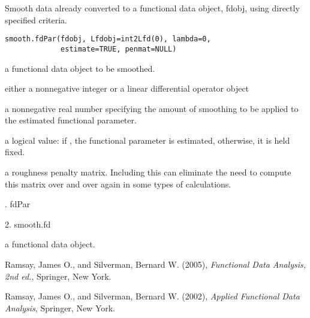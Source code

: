 \begin{Description}\relax
Smooth data already converted to a functional data object, fdobj,
using directly specified criteria.
\end{Description}
\begin{Usage}
\begin{verbatim}
smooth.fdPar(fdobj, Lfdobj=int2Lfd(0), lambda=0,
             estimate=TRUE, penmat=NULL) 
\end{verbatim}
\end{Usage}
\begin{Arguments}
\begin{ldescription}
\item[\code{fdobj}] a functional data object to be smoothed.    

\item[\code{Lfdobj}] either a nonnegative integer or a linear differential operator
object 

\item[\code{lambda}] a nonnegative real number specifying the amount of smoothing
to be applied to the estimated functional parameter.

\item[\code{estimate}] a logical value:  if , the functional parameter is
estimated, otherwise, it is held fixed.

\item[\code{penmat}] a roughness penalty matrix.  Including this can eliminate the need
to compute this matrix over and over again in some types of
calculations.

\end{ldescription}
\end{Arguments}
\begin{Details}.  fdPar

2.  smooth.fd
\end{Details}
\begin{Value}
a functional data object.
\end{Value}
\begin{References}\relax
Ramsay, James O., and Silverman, Bernard W. (2005), \emph{Functional 
Data Analysis, 2nd ed.}, Springer, New York. 

Ramsay, James O., and Silverman, Bernard W. (2002), \emph{Applied
Functional Data Analysis}, Springer, New York.
\end{References}
